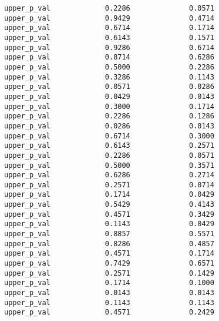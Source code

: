 \documentclass[11pt,leqno]{article}\usepackage[]{graphicx}\usepackage[]{color}
\makeatletter
\newenvironment{kframe}{%
 \def\at@end@of@kframe{}%
 \ifinner\ifhmode%
  \def\at@end@of@kframe{\end{minipage}}%
  \begin{minipage}{\columnwidth}%
 \fi\fi%
 \def\FrameCommand##1{\hskip\@totalleftmargin \hskip-\fboxsep
 \colorbox{shadecolor}{##1}\hskip-\fboxsep
     \hskip-\linewidth \hskip-\@totalleftmargin \hskip\columnwidth}%
 \MakeFramed {\advance\hsize-\width
   \@totalleftmargin\z@ \linewidth\hsize
   \@setminipage}}%
 {\par\unskip\endMakeFramed%
 \at@end@of@kframe}
\newenvironment{knitrout}{}{} %
\theoremstyle{newstyle}
\makeatother
\begin{document}
\begin{knitrout}
\begin{kframe}
\begin{verbatim}
upper_p_val             0.2286              0.0571
upper_p_val             0.9429              0.4714
upper_p_val             0.6714              0.1714
upper_p_val             0.6143              0.1571
upper_p_val             0.9286              0.6714
upper_p_val             0.8714              0.6286
upper_p_val             0.5000              0.2286
upper_p_val             0.3286              0.1143
upper_p_val             0.0571              0.0286
upper_p_val             0.0429              0.0143
upper_p_val             0.3000              0.1714
upper_p_val             0.2286              0.1286
upper_p_val             0.0286              0.0143
upper_p_val             0.6714              0.3000
upper_p_val             0.6143              0.2571
upper_p_val             0.2286              0.0571
upper_p_val             0.5000              0.3571
upper_p_val             0.6286              0.2714
upper_p_val             0.2571              0.0714
upper_p_val             0.1714              0.0429
upper_p_val             0.5429              0.4143
upper_p_val             0.4571              0.3429
upper_p_val             0.1143              0.0429
upper_p_val             0.8857              0.5571
upper_p_val             0.8286              0.4857
upper_p_val             0.4571              0.1714
upper_p_val             0.7429              0.6571
upper_p_val             0.2571              0.1429
upper_p_val             0.1714              0.1000
upper_p_val             0.0143              0.0143
upper_p_val             0.1143              0.1143
upper_p_val             0.4571              0.2429
\end{verbatim}
\end{kframe}
\end{knitrout}




\newpage


\begin{singlespace}
\end{singlespace}

\newpage
\end{document}
